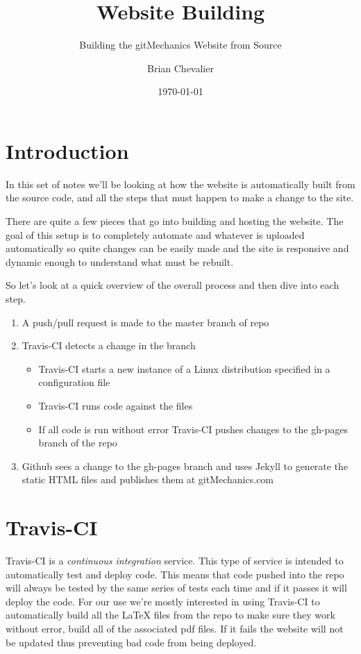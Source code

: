 \documentclass[landscape, twocolumn, 12pt]{article}
\title{Website Building}
\subtitle{Building the gitMechanics Website from Source}
\author{Brian Chevalier}
\date{\today}
\begin{document}
\maketitle


\section{Introduction}
In this set of notes we'll be looking at how the website is automatically built from the source code, and all the steps that must happen to make a change to the site.

There are quite a few pieces that go into building and hosting the website. The goal of this setup is to completely automate and whatever is uploaded automatically so quite changes can be easily made and the site is responsive and dynamic enough to understand what must be rebuilt.

So let's look at a quick overview of the overall process and then dive into each step.

\begin{enumerate}
	\item A push/pull request is made to the master branch of repo
	\item Travis-CI detects a change in the branch
	\begin{itemize}
		\item Travis-CI starts a new instance of a Linux distribution specified in a configuration file
		\item Travis-CI runs code against the files
		\item If all code is run without error Travis-CI pushes changes to the gh-pages branch of the repo
	\end{itemize}
	\item Github sees a change to the gh-pages branch and uses Jekyll to generate the static HTML files and publishes them at gitMechanics.com
\end{enumerate}

\section{Travis-CI}
Travis-CI is a \textit{continuous integration} service. This type of service is intended to automatically test and deploy code. This means that code pushed into the repo will always be tested by the same series of tests each time and if it passes it will deploy the code. For our use we're mostly interested in using Travis-CI to automatically build all the \LaTeX{} files from the repo to make sure they work without error, build all of the associated pdf files. If it fails the website will not be updated thus preventing bad code from being deployed.
\end{document}
